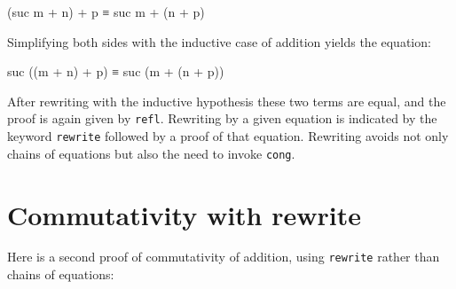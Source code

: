 \begin{myDisplay}
(suc m + n) + p ≡ suc m + (n + p)
\end{myDisplay}

Simplifying both sides with the inductive case of addition yields the
equation:

\begin{myDisplay}
suc ((m + n) + p) ≡ suc (m + (n + p))
\end{myDisplay}

After rewriting with the inductive hypothesis these two terms are equal,
and the proof is again given by \texttt{refl}. Rewriting by a given
equation is indicated by the keyword \texttt{rewrite} followed by a
proof of that equation. Rewriting avoids not only chains of equations
but also the need to invoke \texttt{cong}.

\hypertarget{commutativity-with-rewrite}{%
\section{Commutativity with rewrite}\label{commutativity-with-rewrite}}

Here is a second proof of commutativity of addition, using
\texttt{rewrite} rather than chains of equations:

